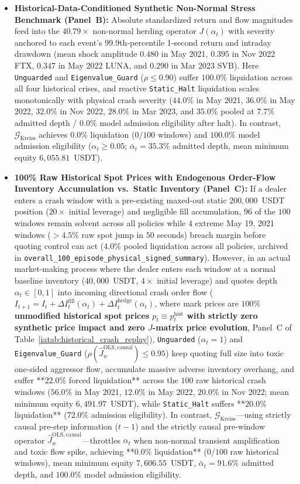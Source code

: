 \documentclass[12pt]{article}
\theoremstyle{definition}
\theoremstyle{remark}
\begin{document}
\begin{itemize}
\item \textbf{Historical-Data-Conditioned Synthetic Non-Normal Stress Benchmark (Panel~B):} Absolute standardized return and flow magnitudes feed into the $40.79\times$ non-normal herding operator $J(\alpha_t)$ with severity anchored to each event's 99.9th-percentile 1-second return and intraday drawdown (mean shock amplitude $0.480$ in May 2021, $0.395$ in Nov 2022 FTX, $0.347$ in May 2022 LUNA, and $0.290$ in Mar 2023 SVB). Here \texttt{Unguarded} and \texttt{Eigenvalue\_Guard} ($\rho \le 0.90$) suffer $100.0\%$ liquidation across all four historical crises, and reactive \texttt{Static\_Halt} liquidation scales monotonically with physical crash severity ($44.0\%$ in May 2021, $36.0\%$ in May 2022, $32.0\%$ in Nov 2022, $28.0\%$ in Mar 2023, and $35.0\%$ pooled at $7.7\%$ admitted depth / $0.0\%$ model admission eligibility after halt). In contrast, $\mathcal{G}_{\mathrm{Kreiss}}$ achieves $0.0\%$ liquidation ($0/100$ windows) and $100.0\%$ model admission eligibility ($\alpha_t \ge 0.05$; $\bar{\alpha}_t = 35.3\%$ admitted depth, mean minimum equity $6{,}055.81$~USDT).
\item \textbf{100\% Raw Historical Spot Prices with Endogenous Order-Flow Inventory Accumulation vs.\ Static Inventory (Panel~C):} If a dealer enters a crash window with a pre-existing maxed-out static $200{,}000$~USDT position ($20\times$ initial leverage) and negligible fill accumulation, $96$ of the $100$ windows remain solvent across all policies while $4$ extreme May 19, 2021 windows ($>4.5\%$ raw spot jump in $50$ seconds) breach margin before quoting control can act ($4.0\%$ pooled liquidation across all policies, archived in \texttt{overall\_100\_episode\_physical\_signed\_summary}). However, in an actual market-making process where the dealer enters each window at a normal baseline inventory ($40{,}000$~USDT, $4\times$ initial leverage) and quotes depth $\alpha_t \in [0, 1]$ into incoming directional crash order flow ($I_{t+1} = I_t + \Delta I^{\mathrm{fill}}_t(\alpha_t) + \Delta I^{\mathrm{hedge}}_t(\alpha_t)$, where mark prices are \textbf{$100\%$ unmodified historical spot prices $p_t \equiv p_t^{\mathrm{hist}}$ with strictly zero synthetic price impact and zero $J$-matrix price evolution}, Panel~C of Table~\ref{iatab:historical_crash_replay}), \texttt{Unguarded} ($\alpha_t = 1$) and \texttt{Eigenvalue\_Guard} ($\rho(\hat{J}_w^{\mathrm{OLS,causal}}) \le 0.95$) keep quoting full size into toxic one-sided aggressor flow, accumulate massive adverse inventory overhang, and suffer **$22.0\%$ forced liquidation** across the $100$ raw historical crash windows ($56.0\%$ in May 2021, $12.0\%$ in May 2022, $20.0\%$ in Nov 2022; mean minimum equity $6{,}491.97$~USDT), while \texttt{Static\_Halt} suffers **$20.0\%$ liquidation** ($72.0\%$ admission eligibility). In contrast, $\mathcal{G}_{\mathrm{Kreiss}}$---using strictly causal pre-step information ($t-1$) and the strictly causal pre-window operator $\hat{J}_w^{\mathrm{OLS,causal}}$---throttles $\alpha_t$ when non-normal transient amplification and toxic flow spike, achieving **$0.0\%$ liquidation** ($0/100$ raw historical windows), mean minimum equity $7{,}606.55$~USDT, $\bar{\alpha}_t = 91.6\%$ admitted depth, and $100.0\%$ model admission eligibility.

\end{itemize}
\end{document}
